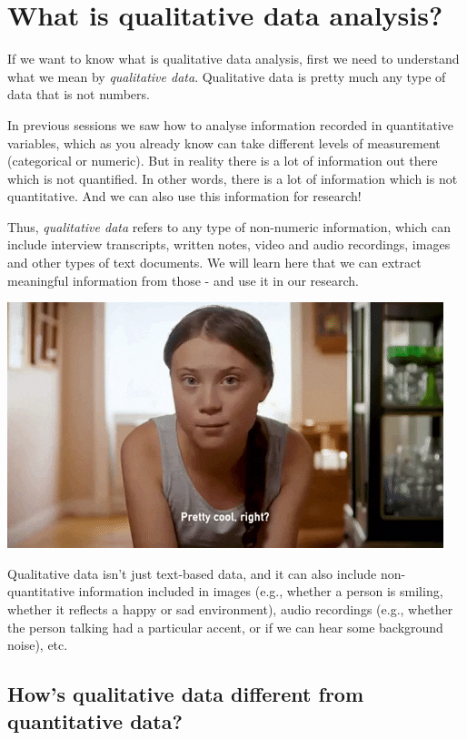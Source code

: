 \documentclass[
]{book}
\begin{document}
\hypertarget{what-is-qualitative-data-analysis}{%
\section{What is qualitative data analysis?}\label{what-is-qualitative-data-analysis}}

If we want to know what is qualitative data analysis, first we need to understand what we mean by \emph{qualitative data}. Qualitative data is pretty much any type of data that is not numbers.

In previous sessions we saw how to analyse information recorded in quantitative variables, which as you already know can take different levels of measurement (categorical or numeric). But in reality there is a lot of information out there which is not quantified. In other words, there is a lot of information which is not quantitative. And we can also use this information for research!

Thus, \emph{qualitative data} refers to any type of non-numeric information, which can include interview transcripts, written notes, video and audio recordings, images and other types of text documents. We will learn here that we can extract meaningful information from those - and use it in our research.

\includegraphics{imgs/coolright.gif}

Qualitative data isn't just text-based data, and it can also include non-quantitative information included in images (e.g., whether a person is smiling, whether it reflects a happy or sad environment), audio recordings (e.g., whether the person talking had a particular accent, or if we can hear some background noise), etc.

\hypertarget{hows-qualitative-data-different-from-quantitative-data}{%
\subsection{How's qualitative data different from quantitative data?}\label{hows-qualitative-data-different-from-quantitative-data}}
\end{document}

